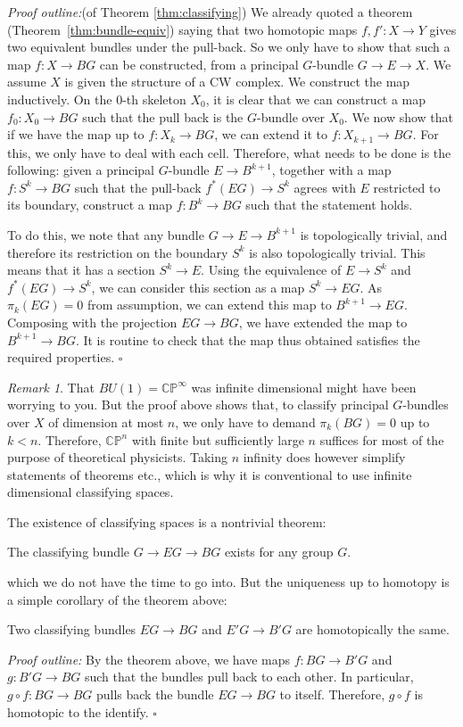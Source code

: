 \documentclass[12pt]{article}
\numberwithin{equation}{section}
\numberwithin{figure}{section}
\theoremstyle{remark}
\newtheorem{remark}[definition]{Remark}
\renewenvironment{proof}{\noindent\textsl{Proof outline:}}{\hfill$\square$}
\def\CP{\mathbb{CP}}
\begin{document}
\begin{proof}(of Theorem \ref{thm:classifying})
We already quoted a theorem (Theorem~\ref{thm:bundle-equiv}) saying that 
two homotopic maps $f,f': X\to Y$ gives two equivalent bundles under the pull-back.
So we only have to show that such a map $f:X\to BG$ can be constructed, 
from a principal $G$-bundle $G\to E\to X$.
We assume $X$ is given  the structure of a CW complex.
We construct the map inductively.
On the 0-th skeleton $X_0$, it is clear that we can construct a map $f_0: X_0\to BG$ such that the pull back is the $G$-bundle over $X_0$.
We now show that if we have the map up to $f:X_k\to BG$,
we can extend it to $f: X_{k+1}\to BG$.
For this, we only have to deal with each cell.
Therefore, what needs to be done is the following:
given a principal $G$-bundle $E\to B^{k+1}$,
together with a map $f: S^k \to BG$ such that the pull-back $f^*(EG)\to S^k$ agrees with $E$ restricted to its boundary,
construct a map $f:B^k\to BG$ such that the statement holds.

To do this, we note that any bundle $G\to E\to B^{k+1}$ is topologically trivial, 
and therefore its restriction on the boundary $S^k$ is also topologically trivial.
This means that it has a section $S^k \to E$.
Using the equivalence of $E\to S^k$ and $f^*(EG)\to S^k$,
we can consider this section as a map $S^k \to EG$.
As $\pi_{k}(EG)=0$ from assumption, we can extend this map to $B^{k+1}\to EG$.
Composing with the projection $EG\to BG$, we have extended the map to $B^{k+1}\to BG$.
It is routine to check that the map thus obtained satisfies the required properties.
\end{proof}

\begin{remark}
That $BU(1)=\CP^\infty$ was infinite dimensional might have been worrying to you.
But the proof above shows that, to classify principal $G$-bundles over $X$ of dimension at most $n$,
we only have to demand $\pi_{k}(BG)=0$ up to $k<n$.
Therefore, $\CP^n$ with finite but sufficiently large $n$ suffices for most of the purpose of theoretical physicists.
Taking $n$ infinity does however simplify statements of theorems etc., 
which is why it is conventional to use infinite dimensional classifying spaces.
\end{remark}

The existence of classifying spaces is a nontrivial theorem:
\begin{theorem}
The classifying bundle $G\to EG\to BG$ exists for any group $G$.
\end{theorem}
which we do not have the time to go into.
But the uniqueness up to homotopy is a simple corollary of the theorem above:
\begin{proposition}
Two classifying bundles $EG\to BG$ and $E'G\to B'G$ are homotopically the same.
\end{proposition}
\begin{proof}
By the theorem above, we have maps $f:BG\to B'G$ and $g:B'G\to BG$ 
such that the bundles pull back to each other. 
In particular, $g\circ f: BG\to BG$ pulls back the bundle $EG\to BG$ to itself.
Therefore, $g\circ f$ is homotopic to the identify.
\end{proof}
\end{document}
